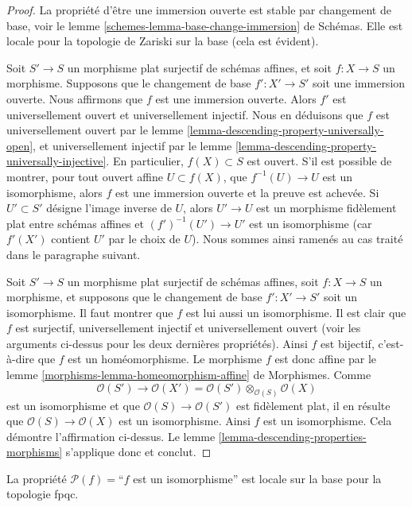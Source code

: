 \begin{proof}
La propriété d'être une immersion ouverte est stable par changement de base,
voir le lemme \ref{schemes-lemma-base-change-immersion} de Schémas.
Elle est locale pour la topologie de Zariski sur la base
(cela est évident).

\medskip\noindent
Soit $S' \to S$ un morphisme plat surjectif de schémas affines,
et soit $f : X \to S$ un morphisme. Supposons que le changement de base
$f' : X' \to S'$ soit une immersion ouverte. Nous affirmons que $f$ est une
immersion ouverte.
Alors $f'$ est universellement ouvert et universellement injectif.
Nous en déduisons que $f$ est universellement ouvert par le
lemme \ref{lemma-descending-property-universally-open}, et
universellement injectif par le
lemme \ref{lemma-descending-property-universally-injective}.
En particulier, $f(X) \subset S$ est ouvert. S'il est possible de montrer,
pour tout ouvert affine $U \subset f(X)$, que $f^{-1}(U) \to U$
est un isomorphisme, alors $f$ est une immersion ouverte et la preuve est
achevée. Si $U' \subset S'$ désigne l'image inverse de $U$,
alors $U' \to U$ est un morphisme fidèlement plat entre schémas affines et
$(f')^{-1}(U') \to U'$ est un isomorphisme (car $f'(X')$ contient $U'$
par le choix de $U$). Nous sommes ainsi ramenés au cas traité dans le
paragraphe suivant.

\medskip\noindent
Soit $S' \to S$ un morphisme plat surjectif de schémas affines,
soit $f : X \to S$ un morphisme, et supposons que le changement de base
$f' : X' \to S'$ soit un isomorphisme. Il faut montrer que $f$ est lui aussi
un isomorphisme. Il est clair que $f$ est surjectif, universellement injectif
et universellement ouvert (voir les arguments ci-dessus pour les deux
dernières propriétés). Ainsi $f$ est bijectif, c'est-à-dire que $f$ est un
homéomorphisme. Le morphisme $f$ est donc affine par le lemme
\ref{morphisms-lemma-homeomorphism-affine} de Morphismes. Comme
$$
\mathcal{O}(S') \to
\mathcal{O}(X') =
\mathcal{O}(S') \otimes_{\mathcal{O}(S)} \mathcal{O}(X)
$$
est un isomorphisme et que $\mathcal{O}(S) \to \mathcal{O}(S')$
est fidèlement plat, il en résulte que
$\mathcal{O}(S) \to \mathcal{O}(X)$ est un isomorphisme.
Ainsi $f$ est un isomorphisme. Cela démontre l'affirmation ci-dessus.
Le lemme \ref{lemma-descending-properties-morphisms} s'applique donc et conclut.
\end{proof}

\begin{lemma}
\label{lemma-descending-property-isomorphism}
La propriété $\mathcal{P}(f) =$``$f$ est un isomorphisme''
est locale sur la base pour la topologie fpqc.
\end{lemma}

